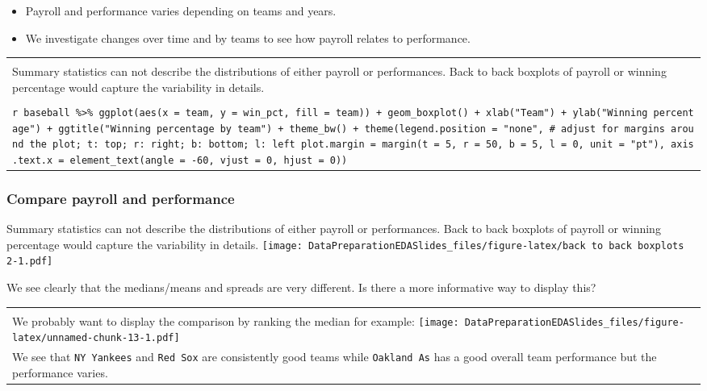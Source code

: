 \documentclass[
]{article}
\providecommand{\tightlist}{%
  \setlength{\itemsep}{0pt}\setlength{\parskip}{0pt}}
\begin{document}
\begin{itemize}
\tightlist
\item
  Payroll and performance varies depending on teams and years.\\
\item
  We investigate changes over time and by teams to see how payroll
  relates to performance.
\end{itemize}

\begin{longtable}[]{@{}
  >{\raggedright\arraybackslash}p{}@{}}
\toprule
\endhead
 \\
Summary statistics can not describe the distributions of either payroll
or performances. Back to back boxplots of payroll or winning percentage
would capture the variability in details. \\
\tiny \\
\texttt{r\ baseball\ \%\textgreater{}\%\ ggplot(aes(x\ =\ team,\ y\ =\ win\_pct,\ fill\ =\ team))\ +\ geom\_boxplot()\ +\ xlab("Team")\ +\ ylab("Winning\ percentage")\ +\ ggtitle("Winning\ percentage\ by\ team")\ +\ theme\_bw()\ +\ theme(legend.position\ =\ "none",\ \#\ adjust\ for\ margins\ around\ the\ plot;\ t:\ top;\ r:\ right;\ b:\ bottom;\ l:\ left\ plot.margin\ =\ margin(t\ =\ 5,\ r\ =\ 50,\ b\ =\ 5,\ l\ =\ 0,\ unit\ =\ "pt"),\ axis.text.x\ =\ element\_text(angle\ =\ -60,\ vjust\ =\ 0,\ hjust\ =\ 0))} \\
\bottomrule
\end{longtable}

\frametitle{Compare payroll and performance}

Summary statistics can not describe the distributions of either payroll
or performances. Back to back boxplots of payroll or winning percentage
would capture the variability in details.
\texttt{[image: DataPreparationEDASlides\_files/figure-latex/back to back boxplots 2-1.pdf]}

\normalsize

We see clearly that the medians/means and spreads are very different. Is
there a more informative way to display this?

\begin{longtable}[]{@{}
  >{\raggedright\arraybackslash}p{}@{}}
\toprule
\endhead
 \\
We probably want to display the comparison by ranking the median for
example:
\texttt{[image: DataPreparationEDASlides\_files/figure-latex/unnamed-chunk-13-1.pdf]} \\
\normalsize We see that \texttt{NY\ Yankees} and \texttt{Red\ Sox} are
consistently good teams while \texttt{Oakland\ A\textquotesingle{}s} has
a good overall team performance but the performance varies. \\
\bottomrule
\end{longtable}
\end{document}
